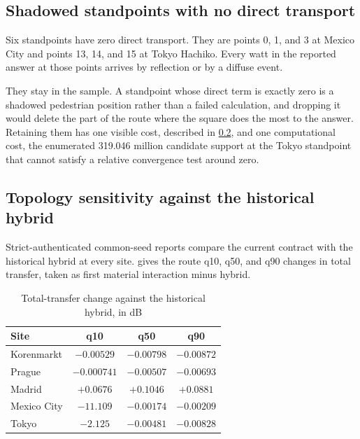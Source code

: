 \subsection{Shadowed standpoints with no direct transport}
\label{sec:zero-direct}

Six standpoints have zero direct transport. They are points 0, 1, and 3 at
Mexico City and points 13, 14, and 15 at Tokyo Hachiko. Every watt in the
reported answer at those points arrives by reflection or by a diffuse event.

They stay in the sample. A standpoint whose direct term is exactly zero is a
shadowed pedestrian position rather than a failed calculation, and dropping it
would delete the part of the route where the square does the most to the
answer. Retaining them has one visible cost, described in
\cref{sec:topology}, and one computational cost, the enumerated 319.046 million
candidate support at the Tokyo standpoint that cannot satisfy a relative
convergence test around zero.

\subsection{Topology sensitivity against the historical hybrid}
\label{sec:topology}

Strict-authenticated common-seed reports compare the current contract with the
historical hybrid at every site.  gives the route q10, q50,
and q90 changes in total transfer, taken as first material interaction minus
hybrid.

\begin{table}[!t]
  \caption{Total-transfer change against the historical hybrid, in dB}
  \label{tab:topology}
  \centering
  \begin{tabular}{lccc}
    \toprule
    Site & q10 & q50 & q90 \\
    \midrule
    Korenmarkt   & $-0.00529$  & $-0.00798$ & $-0.00872$ \\
    Prague       & $-0.000741$ & $-0.00507$ & $-0.00693$ \\
    Madrid       & $+0.0676$   & $+0.1046$  & $+0.0881$ \\
    Mexico City  & $-11.109$   & $-0.00174$ & $-0.00209$ \\
    Tokyo        & $-2.125$    & $-0.00481$ & $-0.00828$ \\
    \bottomrule
  \end{tabular}
\end{table}

